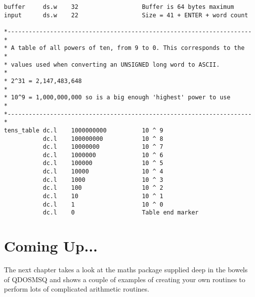 \begin{lstlisting}[firstnumber=last,caption={Dataspace Program - Part 14 - Various Subroutines}]
buffer     ds.w    32                  Buffer is 64 bytes maximum
input      ds.w    22                  Size = 41 + ENTER + word count

*---------------------------------------------------------------------*
* A table of all powers of ten, from 9 to 0. This corresponds to the  *
* values used when converting an UNSIGNED long word to ASCII.         *
* 2^31 = 2,147,483,648                                                *
* 10^9 = 1,000,000,000 so is a big enough 'highest' power to use      *
*---------------------------------------------------------------------*
tens_table dc.l    1000000000          10 ^ 9
           dc.l    100000000           10 ^ 8
           dc.l    10000000            10 ^ 7
           dc.l    1000000             10 ^ 6
           dc.l    100000              10 ^ 5
           dc.l    10000               10 ^ 4
           dc.l    1000                10 ^ 3
           dc.l    100                 10 ^ 2
           dc.l    10                  10 ^ 1
           dc.l    1                   10 ^ 0
           dc.l    0                   Table end marker
\end{lstlisting}

\section{Coming Up...}
\label{ch15-the-end}%

The next chapter takes a look at the maths package supplied deep in the bowels of
QDOSMSQ and shows a couple of examples of creating your own routines to perform lots of
complicated arithmetic routines.
